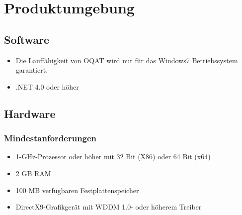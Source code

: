 \chapter{Produktumgebung}

\section{Software}
\begin{itemize}
\item Die Lauffähigkeit von \gls{OQAT} wird nur für das Windows7 Betriebssystem garantiert.
\item .NET 4.0 oder höher
\end{itemize}
\section{Hardware}
\subsection{Mindestanforderungen}
\begin{itemize}
\item 1-GHz-Prozessor oder höher mit 32 Bit (X86) oder 64 Bit (x64)
\item 2 GB RAM
\item 100 MB verfügbaren Festplattenspeicher 
\item DirectX9-Grafikgerät mit WDDM 1.0- oder höherem Treiber
\end{itemize}